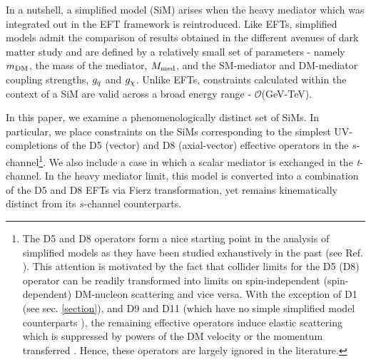 In a nutshell, a simplified model (SiM) arises when the heavy mediator which was integrated out in the EFT framework is reintroduced. Like EFTs, simplified models admit the comparison of results obtained in the different avenues of dark matter study \cite{} and are defined by a relatively small set of parameters - namely $m_{\mathrm{DM}}$, the mass of the mediator, $M_{\mathrm{med}}$, and the SM-mediator and DM-mediator coupling strengths, $g_q$ and $g_{\chi}$. Unlike EFTs, constraints calculated within the context of a SiM are valid across a broad energy range - $\mathcal{O}$(GeV-TeV).

In this paper, we examine a phenomenologically distinct set of SiMs. In particular, we place constraints on the SiMs corresponding to the simplest UV-completions of the D5 (vector) and D8 (axial-vector) effective operators in the $s$-channel\footnote{The D5 and D8 operators form a nice starting point in the analysis of simplified models as they have been studied exhaustively in the past (see Ref. \cite{}). This attention is motivated by the fact that collider limits for the D5 (D8) operator can be readily transformed into limits on spin-independent (spin-dependent) DM-nucleon scattering and vice versa. With the exception of D1 (see sec. \ref{section}), and D9 and D11 (which have no simple simplified model counterparts \cite{}), the remaining effective operators induce elastic scattering which is suppressed by powers of the DM velocity or the momentum transferred \cite{Kumar}. Hence, these operators are largely ignored in the literature.}. We also include a case in which a scalar mediator is exchanged in the \textit{t}-channel. In the heavy mediator limit, this model is converted into a combination of the D5 and D8 EFTs via Fierz transformation, yet remains kinematically distinct from its $s$-channel counterparts.


